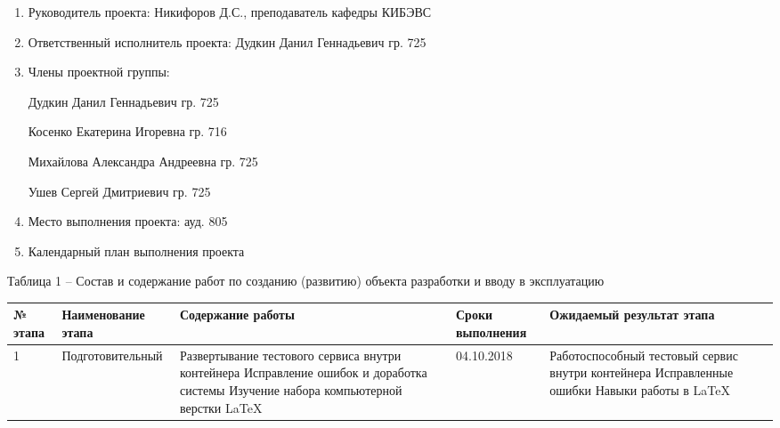 \begin{enumerate}
\item Руководитель проекта:  Никифоров Д.С., преподаватель кафедры КИБЭВС\par
\item Ответственный исполнитель проекта: Дудкин Данил Геннадьевич гр. 725\par
\item Члены проектной группы:\par
\hspace{2cm}Дудкин Данил Геннадьевич гр. 725\par
\hspace{2cm}Косенко Екатерина Игоревна гр. 716\par
\hspace{2cm}Михайлова Александра Андреевна гр. 725\par
\hspace{2cm}Ушев Сергей Дмитриевич гр. 725\par
\item Место выполнения проекта: ауд. 805\par
\item Календарный план выполнения проекта\par
\end{enumerate}
	
\vspace{\baselineskip}

\noindent Таблица 1 -- Состав и содержание работ по созданию (развитию) объекта разработки и вводу в эксплуатацию\\

\begin{tabular}{|p{0.5cm}|p{2cm}|p{3cm}|p{3cm}|p{6cm}|}
\hline № этапа & Наименование этапа & Содержание работы & Сроки выполнения & Ожидаемый результат этапа\\ \hline 
1 & Подготовительный & Развертывание тестового сервиса внутри контейнера Исправление ошибок и доработка системы Изучение набора компьютерной верстки \LaTeX & 04.10.2018 & Работоспособный тестовый сервис внутри контейнера Исправленные ошибки Навыки работы в \LaTeX\\
\hline

\end{tabular}

\clearpage
